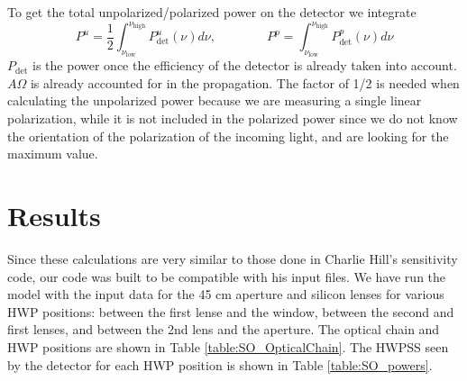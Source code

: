 \documentclass{article}
\theoremstyle{remark}
\newcommand{\tab}{\hspace*{2em}}
\renewcommand{\t}[1]{\text{#1}}
\begin{document}
To get the total unpolarized/polarized power on the detector we integrate 
\[
P^{u} = \frac{1}{2}\int_{\nu_\t{low}}^{\nu_\t{high}} P_\t{det}^u(\nu) d\nu,
\qquad \qquad
P^{p} = \int_{\nu_\t{low}}^{\nu_\t{high}} P_\t{det}^p(\nu) d\nu
\]
$P_\t{det}$ is the power once the efficiency of the detector is already taken into account. 
$A\Omega$ is already accounted for in the propagation.
The factor of 1/2 is needed when calculating the unpolarized power because we are measuring a single linear polarization,
while it is not included in the polarized power since we do not know the orientation of the polarization of the incoming light, 
and are looking for the maximum value.

\section*{Results}
\tab Since these calculations are very similar to those done in Charlie Hill's sensitivity code,
our code was built to be compatible with his input files.
We have run the model with the input data for the 45 cm aperture and silicon lenses for various HWP positions:
between the first lense and the window, between the second and first lenses, and between the 2nd lens and the aperture.
The optical chain and HWP positions are shown in Table \ref{table:SO_OpticalChain}.
The HWPSS seen by the detector for each HWP position is shown in Table \ref{table:SO_powers}.
\end{document}
